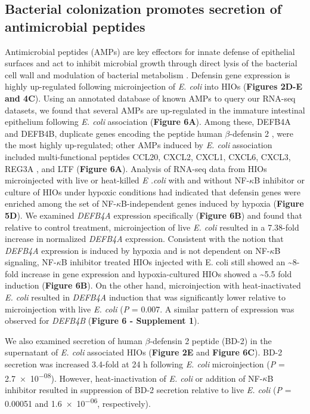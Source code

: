 \documentclass[9pt,lineo]{elife}
\begin{document}
\subsection*{{\bfseries\sffamily } Bacterial colonization promotes secretion of antimicrobial peptides}
\label{sec:orgheadline8}
Antimicrobial peptides (AMPs) are key effectors for innate defense of epithelial surfaces \citep{Muniz:2012} and act to inhibit microbial growth through direct lysis of the bacterial cell wall and modulation of bacterial metabolism  \citep{Ganz:2003,Bevins:2011,O'Neil:2003,Vora:2004,Brogden:2005}. Defensin gene expression is highly up-regulated following microinjection of \emph{E. coli} into HIOs (\textbf{Figures 2D-E and 4C}). Using an annotated database of known AMPs \citep{Wang:2016} to query our RNA-seq datasets, we found that several AMPs are up-regulated in the immature intestinal epithelium following \emph{E. coli} association (\textbf{Figure 6A}). Among these, DEFB4A and DEFB4B, duplicate genes encoding the peptide human \(\beta\)-defensin 2 \citep{Harder:1997}, were the most highly up-regulated; other AMPs induced by \emph{E. coli} association included multi-functional peptides CCL20, CXCL2, CXCL1, CXCL6, CXCL3, REG3A \citep{Cash:2006}, and LTF (\textbf{Figure 6A}). Analysis of RNA-seq data from HIOs microinjected with live or heat-killed \emph{E .coli} with and without NF-\(\kappa\)B inhibitor or culture of HIOs under hypoxic conditions had indicated that defensin genes were enriched among the set of NF-\(\kappa\)B-independent genes induced by hypoxia (\textbf{Figure 5D}). We examined \emph{DEFB4A} expression specifically (\textbf{Figure 6B}) and found that relative to control treatment, microinjection of live \emph{E. coli} resulted in a 7.38-fold increase in normalized \emph{DEFB4A} expression. Consistent with the notion that \emph{DEFB4A} expression is induced by hypoxia and is not dependent on NF-\(\kappa\)B signaling, NF-\(\kappa\)B inhibitor treated HIOs injected with E. coli still showed an \textasciitilde{}8-fold increase in gene expression and hypoxia-cultured HIOs showed a \textasciitilde{}5.5 fold induction (\textbf{Figure 6B}). On the other hand, microinjection with heat-inactivated \emph{E. coli} resulted in \emph{DEFB4A} induction that was significantly lower relative to microinjection with live \emph{E. coli} (\emph{P} = 0.007. A similar pattern of expression was observed for \emph{DEFB4B} (\textbf{Figure 6 - Supplement 1}).

We also examined secretion of human \(\beta\)-defensin 2 peptide (BD-2) in the supernatant of \emph{E. coli} associated HIOs (\textbf{Figure 2E} and \textbf{Figure 6C}). BD-2 secretion was increased 3.4-fold at 24 h following \emph{E. coli} microinjection (\emph{P} = \num{2.7e-08}). However, heat-inactivation of \emph{E. coli} or addition of NF-\(\kappa\)B inhibitor resulted in suppression of BD-2 secretion relative to live \emph{E. coli} (\emph{P} = \num{0.00051} and \num{1.6e-06}, respectively). 
\end{document}
